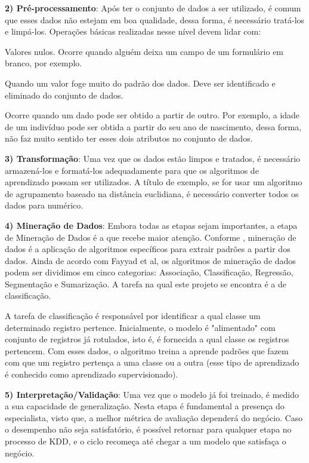 \textbf{2) Pré-processamento}: Após ter o conjunto de dados a ser utilizado, é comum que esses dados não estejam em boa qualidade, dessa forma, é necessário tratá-los e limpá-los. Operações básicas realizadas nesse nível devem lidar com:

\begin{itemize}[leftmargin=1.2cm]
    \begin{description}[font=$ \bullet $]
        \item [ Valores faltantes] Valores nulos. Ocorre quando alguém deixa um campo de um formulário em branco, por exemplo.
        \item [ \textit{Outliers}] Quando um valor foge muito do padrão dos dados. Deve ser identificado e eliminado do conjunto de dados.
        \item[ Dados derivados] Ocorre quando um dado pode ser obtido a partir de outro. Por exemplo, a idade de um indivíduo pode ser obtida a partir do seu ano de nascimento, dessa forma, não faz muito sentido ter esses dois atributos no conjunto de dados.
    \end{description}
\end{itemize}

\textbf{3) Transformação}: Uma vez que os dados estão limpos e tratados, é necessário armazená-los e formatá-los adequadamente para que os algoritmos de aprendizado possam ser utilizados. A título de exemplo, se for usar um algoritmo de agrupamento baseado na distância euclidiana, é necessário converter todos os dados para numérico.

\textbf{4) Mineração de Dados}:  Embora todas as etapas sejam importantes, a etapa de Mineração de Dados é a que recebe maior atenção. Conforme \cite{fayyad:1996}, mineração de dados é a aplicação de algoritmos específicos para extrair padrões a partir dos dados. Ainda de acordo com Fayyad et al, os algoritmos de mineração de dados podem ser dividimos em cinco categorias: Associação, Classificação, Regressão, Segmentação e Sumarização. A tarefa na qual este projeto se encontra é a de classificação. 

A tarefa de classificação é responsável por identificar a qual classe um determinado registro pertence. Inicialmente, o modelo é "alimentado" com conjunto de registros já rotulados, isto é, é fornecida a qual classe os registros pertencem. Com esses dados, o algoritmo treina a aprende padrões que fazem com que um registro pertença a uma classe ou a outra
(esse tipo de aprendizado é conhecido como aprendizado supervisionado).


\textbf{5) Interpretação/Validação}: Uma vez que o modelo já foi treinado, é medido a sua capacidade de generalização. Nesta etapa é fundamental a presença do especialista, visto que, a melhor métrica de avaliação dependerá do negócio. Caso o desempenho não seja satisfatório, é possível retornar para qualquer etapa no processo de KDD, e o ciclo recomeça até chegar a um modelo que satisfaça o negócio.





